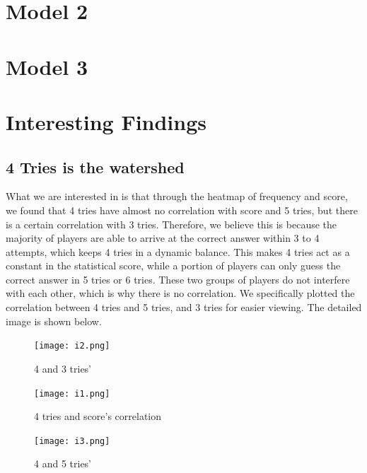 \documentclass{mcmthesis}  %
\begin{document}
\section{Model 2}  %

\section{Model 3}  %

\section{Interesting Findings}  %
\subsection{4 Tries is the watershed}
What we are interested in is that through the heatmap of frequency and score, we found that 4 tries have almost no correlation with score 
and 5 tries, but there is a certain correlation with 3 tries.
Therefore, we believe this is because the majority of players are able to arrive at the correct answer within 3 to 4 attempts, which keeps 
4 tries in a dynamic balance. This makes 4 tries act as a constant in the statistical score, while a portion of players can only guess the 
correct answer in 5 tries or 6 tries. These two groups of players do not interfere with each other, which is why there is no correlation. 
We specifically plotted the correlation between 4 tries and 5 tries, and 3 tries for easier viewing. The detailed image is shown below.
\begin{figure}[h]  %
        \centering  %
        \begin{minipage}[c]{0.32\textwidth}  %
        \centering  %
        \texttt{[image: i2.png]}  %
        \caption{4 and 3 tries'} \label{Figure9}  %
        \end{minipage}  %
        \hspace{0.02\textwidth}
        \begin{minipage}[c]{0.32\textwidth}  %
        \centering  %
        \texttt{[image: i1.png]}  %
        \caption{4 tries and score's correlation} \label{Figure8}  %
        \end{minipage}  %
        \begin{minipage}[c]{0.32\textwidth}
        \texttt{[image: i3.png]}  %
        \caption{4 and 5 tries'} \label{Figure10}  %
        \end{minipage}
\end{figure}  %
\end{document}
